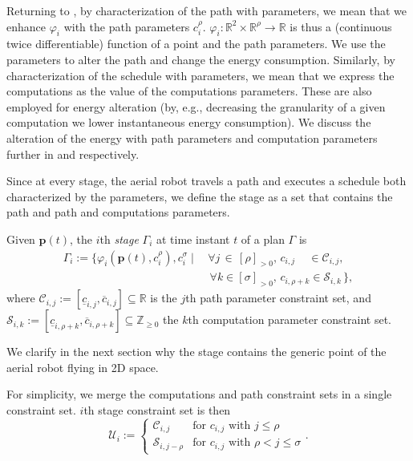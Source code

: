Returning to , by characterization of the path with parameters, we mean that we enhance $\varphi_i$ with the path parameters $c_i^\rho$. $\varphi_i:\mathbb{R}^2\times\mathbb{R}^\rho\rightarrow\mathbb{R}$ is thus a (continuous twice differentiable) function of a point and the path parameters. We use the parameters to alter the path and change the energy consumption. Similarly, by characterization of the schedule with parameters, we mean that we express the computations as the value of the computations parameters. These are also employed for energy alteration (by, e.g., decreasing the granularity of a given computation we lower instantaneous energy consumption). We discuss the alteration of the energy with path parameters and computation parameters further in  and  respectively.

Since at every stage, the aerial robot travels a path and executes a schedule both characterized by the parameters, we define the stage as a set that contains the path and path and computations parameters.

\begin{highlight}  
  \begin{defn}[Stage]\label{def:stage}
    Given $\mathbf{p}(t)$, the $i$th \emph{stage} $\Gamma_i$ at time instant $t$ of a plan $\Gamma$ is
    \begin{equation*}\begin{split}
      \Gamma_i:=\{\varphi_i(\mathbf{p}(t),c_i^\rho),c_i^\sigma\mid
      \,&\forall j\,\in\,[\rho]_{>0},\,c_{i,j}\,\,\,\,\,\,\,\in\mathcal{C}_{i,j},\,\\
        &\,\forall k\in[\sigma]_{>0},\,c_{i,\rho+k}\in\mathcal{S}_{i,k}\,\},
    \end{split}\end{equation*}
    where $\mathcal{C}_{i,j}:=[\underline{c}_{i,j},\overline{c}_{i,j}]\subseteq\mathbb{R}$ is the $j$th path parameter constraint set, and $\mathcal{S}_{i,k}:=[\underline{c}_{i,\rho+k},\overline{c}_{i,\rho+k}]\subseteq\mathbb{Z}_{\geq 0}$ the $k$th computation parameter constraint set.
  \end{defn}
\end{highlight}

We clarify in the next section why the stage contains the generic point of the aerial robot flying in 2D space.

For simplicity, we merge the computations and path constraint sets in a single constraint set. $i$th stage constraint set is then
\begin{equation}\label{eq:constraint-set}
  \mathcal{U}_i:=\begin{cases}
  \mathcal{C}_{i,j} & \text{for } c_{i,j} \text{ with } j\leq\rho\\
  \mathcal{S}_{i,j-\rho} & \text{for } c_{i,j} \text{ with } \rho<j\leq\sigma
\end{cases}.\end{equation}


